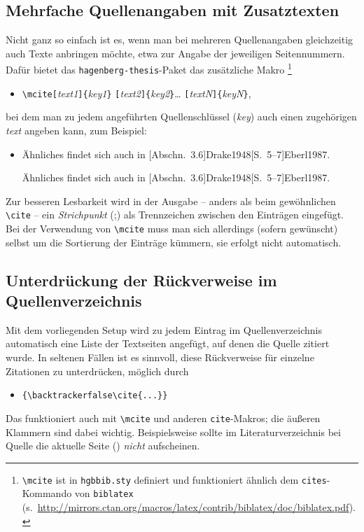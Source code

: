\subsection{Mehrfache Quellenangaben mit Zusatztexten}

Nicht ganz so einfach ist es, wenn man bei mehreren Quellenangaben
gleichzeitig auch Texte anbringen möchte, etwa zur Angabe der jeweiligen
Seitennummern. Dafür bietet das \texttt{hagenberg-thesis}-Paket das
zusätzliche Makro%
\footnote{\texttt{\textbackslash mcite} ist in \texttt{hgbbib.sty} definiert und
funktioniert ähnlich dem \texttt{{\bs}cites}-Kommando von \texttt{biblatex}
(s.\ \url{http://mirrors.ctan.org/macros/latex/contrib/biblatex/doc/biblatex.pdf}).}
%
\begin{itemize}
\item[]
\verb!\mcite[!\textit{text1}\verb!]{!\textit{key1}\verb!}!%
      \verb![!\textit{text2}\verb!]{!\textit{key2}\verb!}!\ldots%
			\verb![!\textit{textN}\verb!]{!\textit{keyN}\verb!}!,
\end{itemize}
%
bei dem man zu jedem angeführten Quellenschlüssel (\textit{key}) auch einen
zugehörigen \textit{text} angeben kann, zum Beispiel:
%
\begin{itemize}
    \item Ähnliches findet sich auch in
    [Abschn.~3.6]{Drake1948}[S.~5--7]{Eberl1987}.
\begin{LaTeXCode}[numbers=none]
Ähnliches findet sich auch in [Abschn.~3.6]{Drake1948}[S.~5--7]{Eberl1987}.
\end{LaTeXCode}
\end{itemize}
%
Zur besseren Lesbarkeit wird in der Ausgabe -- anders als beim gewöhnlichen
\texttt{\textbackslash cite} -- ein \emph{Strichpunkt} (;) als Trennzeichen
zwischen den Einträgen eingefügt. Bei der Verwendung von
\texttt{\textbackslash mcite} muss man sich allerdings (sofern gewünscht)
selbst um die Sortierung der Einträge kümmern, sie erfolgt nicht automatisch.


\subsection{Unterdrückung der Rückverweise im Quellenverzeichnis}

Mit dem vorliegenden Setup wird zu jedem Eintrag im Quellenverzeichnis
automatisch eine Liste der Textseiten angefügt, auf denen die Quelle zitiert
wurde. In seltenen Fällen ist es sinnvoll, diese Rückverweise für einzelne 
Zitationen zu unterdrücken, möglich durch
%
\begin{itemize}
    \item[] \verb!{\backtrackerfalse\cite{...}}!
\end{itemize}
%
Das funktioniert auch mit \verb!\mcite! und anderen \verb!cite!-Makros;
die äußeren Klammern sind dabei wichtig. Beispielsweise sollte im
Literaturverzeichnis bei Quelle {\backtrackerfalse\parencite{Bezos2022}} 
die aktuelle Seite (\the\value{page}) \emph{nicht} aufscheinen.


